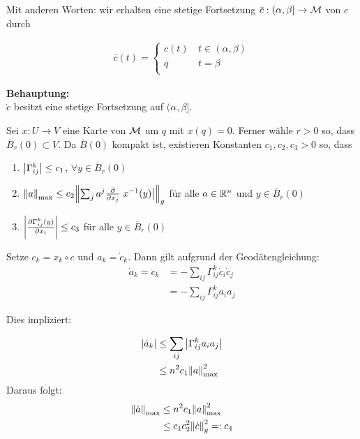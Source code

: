\begin{bew}
Mit anderen Worten: wir erhalten eine stetige Fortsetzung
$\bar{c}: (\alpha , \beta ] \to \mathcal{M}$ von $c$ durch

\begin{align*}
    \bar{c}(t) = \left\{
\begin{array}{ll}
c(t) & \, t\in (\alpha , \beta ) \\
q & \, t = \beta \\
\end{array}
\right.
\end{align*}

\textbf{Behauptung:}\\
$\dot{c}$ besitzt eine stetige Fortsetzung auf $( \alpha , \beta ]$.

\begin{bew}[Behauptung]
Sei $x : U \to V$ eine Karte von $\mathcal{M}$ um $q$ mit $x(q)=0$.
Ferner wähle $r > 0$ so, dass $\overline{B}_r (0) \subset V$.
Da $\overline{B}(0)$ kompakt ist, existieren Konstanten $c_1, c_2, c_3 > 0$ so, dass
\begin{enumerate}
\item $\abs{\Gamma^k_{ij}} \leq c_1$, $\forall y \in \overline{B}_r (0)$
\item $\norm{a}_{\text{max}} \leq c_2 \norm{\sum_j a^j \pdv{x_j}\eval{x^{-1}(y)}}_g$
    für alle $a \in \mathbb{R}^n$ und $y \in \overline{B}_r (0)$
\item $\abs{\pdv{\Gamma^k_{ij} (y)}{x_i}} \leq c_3$ für alle $y \in \overline{B}_r (0)$
\end{enumerate}

Setze $c_k = x_k \circ c$ und $a_k = \dot{c}_k$.
Dann gilt aufgrund der Geodätengleichung:
\begin{align}
\dot{a}_k = \ddot{c}_k &= - \sum_{ij} \Gamma^k_{ij} \dot{c}_i \dot{c}_j \\
&= - \sum_{ij} \Gamma^k_{ij} a_i a_j 
\end{align}

Dies impliziert:

\begin{align*}
\abs{\dot{a}_k} &\leq \sum_{ij} \abs{\Gamma^k_{ij} a_i a_j} \\
&\leq n^2 c_1 \norm{a}^2_{\text{max}}
\end{align*}
Daraus folgt:
\begin{align*}
\norm{\dot{a}}_{\text{max}} &\leq n^2 c_1 \norm{a}^2_{\text{max}} \\
&\leq c_1 c_2^2 \norm{\dot{c}}^2_g =: c_4
\end{align*}


\end{bew}
\end{bew}
